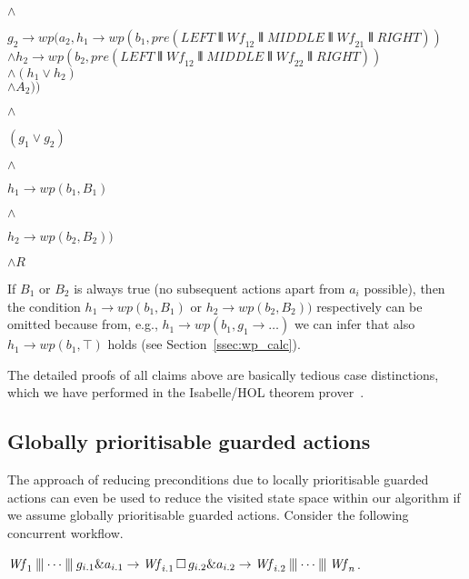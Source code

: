 \documentclass[11pt]{article}
\newcommand{\Wf}{\mathit{Wf}}
\begin{document}
\noindent
$\land$

\noindent
$g_2 \longrightarrow wp(a_2,h_1 \longrightarrow wp(b_1,pre(LEFT \interleave \Wf_{12} \interleave MIDDLE \interleave \Wf_{21} \interleave RIGHT))$ \\
\hspace*{60pt}       $\land h_2 \longrightarrow wp(b_2,pre(LEFT \interleave \Wf_{12} \interleave MIDDLE \interleave \Wf_{22} \interleave RIGHT))$ \\ 
\hspace*{60pt}       $\land (h_1 \lor h_2)$ \\
\hspace*{60pt}       $\land A_2))$

\noindent
$\land$

\noindent
$(g_1 \lor g_2)$

\noindent
$\land$

\noindent
$h_1 \longrightarrow wp(b_1, B_1)$ 

\noindent
$\land$

\noindent
$h_2 \longrightarrow wp(b_2, B_2))$

\noindent
$\land R$


If $B_1$ or $B_2$ is always true (no subsequent actions apart from $a_i$ possible), then the condition $h_1 \longrightarrow wp(b_1, B_1)$ or $h_2 \longrightarrow wp(b_2, B_2))$ respectively can be omitted because from, e.g., $h_1 \longrightarrow wp(b_1, g_1 \longrightarrow \dots)$ we can infer that also $h_1 \longrightarrow wp(b_1, \top)$ holds (see Section~\ref{ssec:wp_calc}).

The detailed proofs of all claims above are basically tedious case distinctions, which we have performed in the Isabelle/HOL theorem prover~\cite{Nipkow2002}.

\subsection{Globally prioritisable guarded actions}
\label{sec:prioritisation}

The approach of reducing preconditions due to locally prioritisable guarded actions can even be used to reduce the visited state space within our algorithm if we assume globally prioritisable guarded actions. Consider the following concurrent workflow.

\noindent
$\Wf_1 \interleave \dots \interleave g_{i.1} \& a_{i.1} \Prefix \Wf_{i.1} \Extchoice g_{i.2} \& a_{i.2} \Prefix \Wf_{i.2} \interleave \dots \interleave \Wf_n$. 
\end{document}
